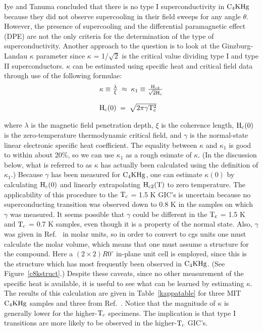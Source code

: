 	Iye and Tanuma concluded that  there is no type I superconductivity
in $\rm  C_4KHg$ because  they did  not observe supercooling in their field
sweeps   for any   angle   $\theta$.\cite{iye82} However,  the presence  of
supercooling  and the differential  paramagnetic effect  (DPE) are  not the
only criteria for  the  determination of  the  type  of  superconductivity.
Another approach to the question is to look at the Ginzburg-Landau $\kappa$
parameter since $\kappa$ = 1/$\sqrt{2}$ is the critical value dividing type
I  and type II superconductors.    $\kappa$ can be estimated using  specific
heat    and    critical    field   data through    use   of   the following
formulae:\cite{tinkham80}\\

\begin{equation}
\begin{array}{l}
\rm \kappa \equiv \frac{\lambda}{\xi} \; \approx \; \kappa_1 \equiv
\frac{H_{c2}}{\sqrt{2}H_{c}} \\
\\
\rm H_{c}(0) \; = \; \sqrt{2 \pi \gamma T_c^2}
\end{array}
\label{kappadef}
\end{equation}

\noindent where $\lambda$ is the magnetic field penetration depth, $\xi$ is the
coherence length,  $\rm  H_{c}(0)$  is  the zero-temperature  thermodynamic
critical field, and $\gamma$ is the normal-state linear electronic specific
heat coefficient.  The equality between $\kappa$ and $\kappa_1$  is good to
within about 20\%,\cite{eilenberger67} so we can use $\kappa_1$  as a rough
esimate of $\kappa$.   (In the discussion below,  what  is  referred  to as
$\kappa$ has actually been calculated using the definition  of $\kappa_1$.)
Because $\gamma$ has been  measured for $\rm C_4KHg$,\cite{alexander81} one
can estimate    $\kappa(0)$  by calculating   $\rm  H_{c}(0)$  and linearly
extrapolating  $\rm H_{c2}(T)$ to  zero temperature.  The  applicability of
this procedure to the  $\rm T_c$ =  1.5  K GIC's is  uncertain  because  no
superconducting  transition was observed down  to 0.8  K in  the samples on
which $\gamma$ was measured.   It  seems possible  that $\gamma$ could   be
different in  the $\rm T_c$ = 1.5  K and $\rm  T_c$ = 0.7  K  samples, even
though it is a property of the normal state.   Also,  $\gamma$ was given in
Ref.~\cite{alexander81} in molar units, so in order to convert to cgs units
one must calculate  the molar volume,  which  means that one  must assume a
structure for the compound.  Here a $(2  \times 2)R0^{\circ}$ in-plane unit
cell is  employed, since this  is the structure  which has  most frequently
been   observed     in    $\rm    C_4KHg$.\cite{kamitakahara84,K167}   (See
Figure~\ref{c8kstruct}.)  Despite these caveats, since no other measurement
of the specific heat is available, it is useful to see what can  be learned
by estimating  $\kappa$.    The results of this   calculation  are given in
Table~\ref{kappatable} for three  MIT $\rm C_4KHg$  samples and three  from
Ref.~\cite{iye82}.    Notice that the  magnitude of   $\kappa$ is generally
lower for the higher-$\rm T_c$  specimens.  The  implication is that type I
transitions are more likely to be observed in the higher-$\rm T_c$ GIC's.

